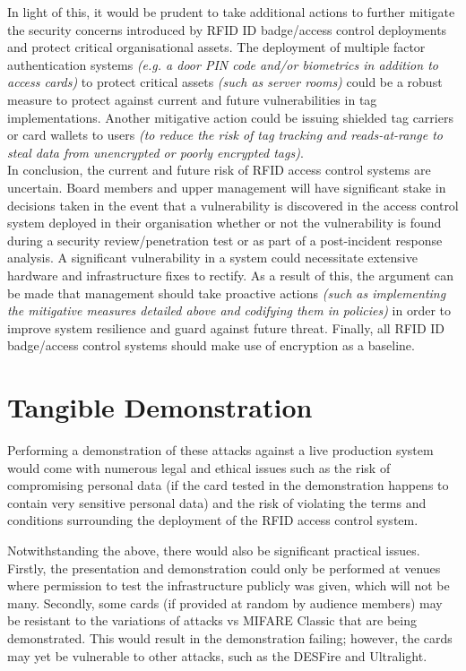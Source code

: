 \noindent In light of this, it would be prudent to take additional actions to further mitigate the security concerns introduced by RFID ID badge/access control deployments and protect critical organisational assets. The deployment of multiple factor authentication systems \textit{(e.g. a door PIN code and/or biometrics in addition to access cards)} to protect critical assets \textit{(such as server rooms)} could be a robust measure to protect against current and future vulnerabilities in tag implementations. Another mitigative action could be issuing shielded tag carriers or card wallets to users \textit{(to reduce the risk of tag tracking and reads-at-range to steal data from unencrypted or poorly encrypted tags)}.\\

\noindent In conclusion, the current and future risk of RFID access control systems are uncertain. Board members and upper management will have significant stake in decisions taken in the event that a vulnerability is discovered in the access control system deployed in their organisation whether or not the vulnerability is found during a security review/penetration test or as part of a post-incident response analysis. A significant vulnerability in a system could necessitate extensive hardware and infrastructure fixes to rectify. As a result of this, the argument can be made that management should take proactive actions \textit{(such as implementing the mitigative measures detailed above and codifying them in policies)} in order to improve system resilience and guard against future threat. Finally, all RFID ID badge/access control systems should make use of encryption as a baseline.

\section{Tangible Demonstration}
Performing a demonstration of these attacks against a live production system would come with numerous legal and ethical issues such as the risk of compromising personal data (if the card tested in the demonstration happens to contain very sensitive personal data) and the risk of violating the terms and conditions surrounding the deployment of the RFID access control system.

Notwithstanding the above, there would also be significant practical issues.
Firstly, the presentation and demonstration could only be performed at venues where permission to test the infrastructure publicly was given, which will not be many. Secondly, some cards (if provided at random by audience members) may be resistant to the variations of attacks vs MIFARE Classic that are being demonstrated. This would result in the demonstration failing; however, the cards may yet be vulnerable to other attacks, such as the DESFire and Ultralight.

